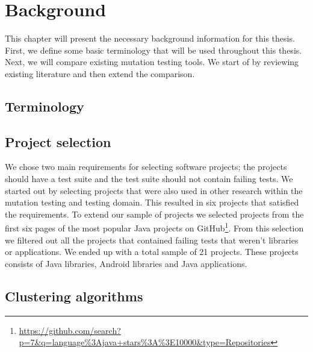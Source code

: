 \documentclass[../main]{subfiles}
\begin{document}
\chapter{Background}
\label{ch:background}
This chapter will present the necessary background information for this thesis. First, we define some basic terminology that will be used throughout this thesis.
Next, we will compare existing mutation testing tools. We start of by reviewing existing literature and then extend the comparison. 
\section{Terminology}
\section{Project selection}
We chose two main requirements for selecting software projects; the projects should have a test suite and the test suite should not contain failing tests.
We started out by selecting projects that were also used in other research within the mutation testing and testing domain\cite{Pizzoleto2019,Yu2019PossibilityScope,Wei2021SpectralTesting, Zhang2019PredictiveTesting, Chen2018SpeedingStudy, Laurent2017AssessingPIT}.
This resulted in six projects that satisfied the requirements.
To extend our sample of projects we selected projects from the first six pages of the most popular Java projects on GitHub\footnote{\url{https://github.com/search?p=7&q=language\%3Ajava+stars\%3A\%3E10000&type=Repositories}}.
From this selection we filtered out all the projects that contained failing tests that weren't libraries or applications.
We ended up with a total sample of 21 projects. 
These projects consists of Java libraries, Android libraries and Java applications.

\section{Clustering algorithms}
\end{document}
